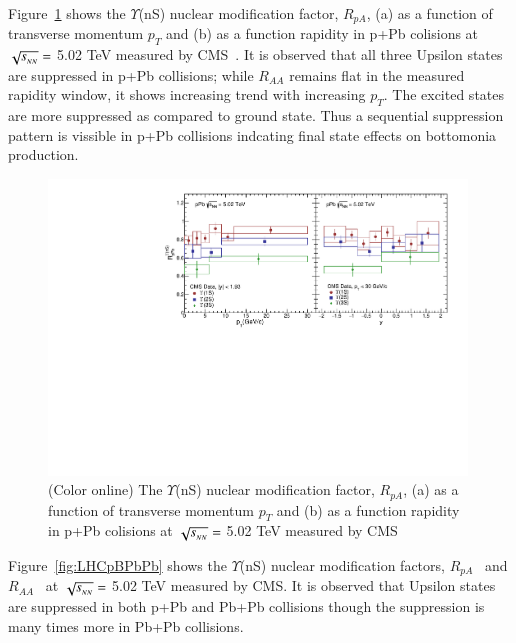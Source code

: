 Figure~\ref{fig:LHCpPb5} shows the $\Upsilon$(nS) nuclear modification factor, $R_{pA}$,
      (a) as a function of transverse momentum $p_{T}$
    and (b) as a function rapidity in p+Pb colisions at $\sqrt{s_{_{NN}}} =$ 5.02 TeV measured by CMS~\cite{CMS:2022wfi}.
    It is observed that all three Upsilon states are suppressed in p+Pb collisions; while
    $R_{AA}$ remains flat in the measured rapidity window, it shows increasing trend with
    increasing $p_T$. The excited states are more suppressed as compared to ground state.
    Thus a sequential suppression pattern is vissible in p+Pb collisions indcating final
    state effects on bottomonia production. 

\begin{figure}
  \includegraphics[width=0.99\textwidth]{Figures/Fig13_LHC_YnSRPPbPtRap.pdf}
     \caption{(Color online) The $\Upsilon$(nS) nuclear modification factor, $R_{pA}$,
      (a) as a function of transverse momentum $p_{T}$
    and (b) as a function rapidity in p+Pb colisions at $\sqrt{s_{_{NN}}} =$ 5.02 TeV measured by CMS~\cite{CMS:2022wfi}
  }
  \label{fig:LHCpPb5}
\end{figure}




Figure~\ref{fig:LHCpBPbPb} shows the $\Upsilon$(nS) nuclear modification factors,
    $R_{pA}$~\cite{CMS:2022wfi} and $R_{AA}$~\cite{CMS:2018zza}
 at $\sqrt{s_{_{NN}}} =$ 5.02 TeV measured by CMS.
 It is observed that Upsilon states are suppressed in both p+Pb and Pb+Pb collisions
 though the suppression is many times more in Pb+Pb collisions. 
    

